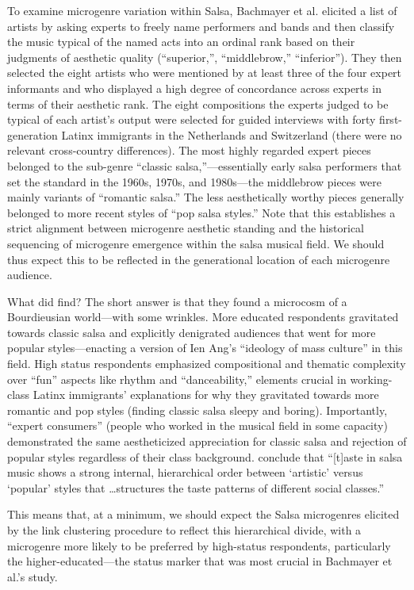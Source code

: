 \documentclass[a4paper,12pt]{extarticle}
\begin{document}
To examine microgenre variation within Salsa, Bachmayer et al. elicited a list of artists by asking experts to freely name performers and bands and then classify the music typical of the named acts into an ordinal rank based on their judgments of aesthetic quality (``superior,'', ``middlebrow,'' ``inferior''). They then selected the eight artists who were mentioned by at least three of the four expert informants and who displayed a high degree of concordance across experts in terms of their aesthetic rank. The eight compositions the experts judged to be typical of each artist's output were selected for guided interviews with forty first-generation Latinx immigrants in the Netherlands and Switzerland (there were no relevant cross-country differences). The most highly regarded expert pieces belonged to the sub-genre ``classic salsa,''---essentially early salsa performers that set the standard in the 1960s, 1970s, and 1980s---the middlebrow pieces were mainly variants of ``romantic salsa.'' The less aesthetically worthy pieces generally belonged to more recent styles of ``pop salsa styles.'' Note that this establishes a strict alignment between microgenre aesthetic standing and the historical sequencing of microgenre emergence within the salsa musical field. We should thus expect this to be reflected in the generational location of each microgenre audience.

What did \citet{Bachmayer2014-pk} find? The short answer is that they found a microcosm of a Bourdieusian world---with some wrinkles. More educated respondents gravitated towards classic salsa and explicitly denigrated audiences that went for more popular styles---enacting a version of Ien Ang's \citeyearpar{ang2000dallas} ``ideology of mass culture'' in this field. High status respondents emphasized compositional and thematic complexity over ``fun'' aspects like rhythm and ``danceability,'' elements crucial in working-class Latinx immigrants' explanations for why they gravitated towards more romantic and pop styles (finding classic salsa sleepy and boring). Importantly, ``expert consumers'' (people who worked in the musical field in some capacity) demonstrated the same aestheticized appreciation for classic salsa and rejection of popular styles regardless of their class background. \citep[][62]{Bachmayer2014-pk} conclude that ``[t]aste in salsa music shows a strong internal, hierarchical order between `artistic' versus `popular' styles that \ldots structures the taste patterns of different social classes.'' 

This means that, at a minimum, we should expect the Salsa microgenres elicited by the link clustering procedure to reflect this hierarchical divide, with a microgenre more likely to be preferred by high-status respondents, particularly the higher-educated---the status marker that was most crucial in Bachmayer et al.'s study. 
\end{document}
